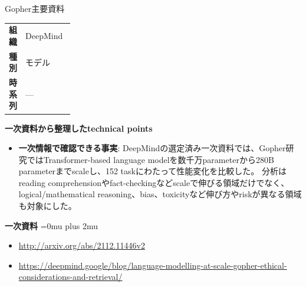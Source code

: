 \begin{technicalnote}{Gopher}{主要資料}
\begingroup
\begin{tabularx}{\linewidth}{@{}>{\bfseries}p{0.22\linewidth}X@{}}
組織 & DeepMind \\
種別 & モデル \\
時系列 & — \\
\end{tabularx}
\smallskip
{\bfseries 一次資料から整理したtechnical points}
\begin{itemize}[leftmargin=1.5em,itemsep=0.35em]
\item \textbf{一次情報で確認できる事実}: DeepMindの選定済み一次資料では、Gopher研究ではTransformer-based language modelを数千万parameterから280B parameterまでscaleし、152 taskにわたって性能変化を比較した。 分析はreading comprehensionやfact-checkingなどscaleで伸びる領域だけでなく、logical/mathematical reasoning、bias、toxicityなど伸び方やriskが異なる領域も対象にした。
\end{itemize}
\begin{minipage}{\linewidth}
\begin{samepage}
{\bfseries 一次資料}
\begingroup\sloppy
\Urlmuskip=0mu plus 2mu\relax
\begin{itemize}[leftmargin=1.5em,itemsep=0.25em]
\item {\scriptsize\url{http://arxiv.org/abs/2112.11446v2}}
\item {\scriptsize\url{https://deepmind.google/blog/language-modelling-at-scale-gopher-ethical-considerations-and-retrieval/}}
\end{itemize}
\endgroup
\end{samepage}
\end{minipage}
\endgroup
\end{technicalnote}
\medskip

